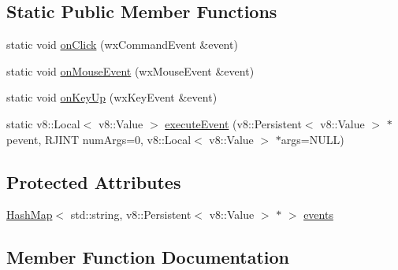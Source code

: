 \subsection*{Static Public Member Functions}
\begin{DoxyCompactItemize}
\item 
static void \mbox{\hyperlink{class_rad_j_a_v_1_1_g_u_i_1_1_g_object_base_afba78daebc32a683b71a8125e00e4d61}{on\+Click}} (wx\+Command\+Event \&event)
\item 
static void \mbox{\hyperlink{class_rad_j_a_v_1_1_g_u_i_1_1_g_object_base_a5836c0dfb6550d2e4184b60a18028ee2}{on\+Mouse\+Event}} (wx\+Mouse\+Event \&event)
\item 
static void \mbox{\hyperlink{class_rad_j_a_v_1_1_g_u_i_1_1_g_object_base_aa0e54747d2e4e4eed32cc1c17183ab83}{on\+Key\+Up}} (wx\+Key\+Event \&event)
\item 
static v8\+::\+Local$<$ v8\+::\+Value $>$ \mbox{\hyperlink{class_rad_j_a_v_1_1_g_u_i_1_1_g_object_base_a6ae8c6fadf1d34da7d0fbd04e7c43030}{execute\+Event}} (v8\+::\+Persistent$<$ v8\+::\+Value $>$ $\ast$pevent, R\+J\+I\+NT num\+Args=0, v8\+::\+Local$<$ v8\+::\+Value $>$ $\ast$args=N\+U\+LL)
\end{DoxyCompactItemize}
\subsection*{Protected Attributes}
\begin{DoxyCompactItemize}
\item 
\mbox{\hyperlink{namespace_rad_j_a_v_a7c83af3095bdd8035fd71ff008120f08}{Hash\+Map}}$<$ std\+::string, v8\+::\+Persistent$<$ v8\+::\+Value $>$ $\ast$ $>$ \mbox{\hyperlink{class_rad_j_a_v_1_1_g_u_i_1_1_g_object_base_a063fa71445fea6da54ea7d00f0750518}{events}}
\end{DoxyCompactItemize}


\subsection{Member Function Documentation}
\mbox{\label{class_rad_j_a_v_1_1_g_u_i_1_1_g_object_base_a1a7638a8c8ce513a4688a6907f02b6ca}} 
